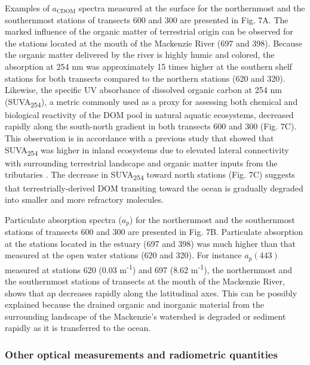 \documentclass[essd, manuscript]{copernicus}
\begin{document}
Examples of $a_\text{CDOM}$ spectra measured at the surface for the northernmost and the southernmost stations of transects 600 and 300 are presented in Fig. 7A. The marked influence of the organic matter of terrestrial origin can be observed for the stations located at the mouth of the Mackenzie River (697 and 398). Because the organic matter delivered by the river is highly humic and colored, the absorption at 254 nm was approximately 15 times higher at the southern shelf stations for both transects compared to the northern stations (620 and 320). Likewise, the specific UV absorbance of dissolved organic carbon at 254 nm (SUVA\textsubscript{254}), a metric commonly used as a proxy for assessing both chemical \citep{weishaar2003, westerhoff2004} and biological reactivity \citep{berggren2009, asmala2013} of the DOM pool in natural aquatic ecosystems, decreased rapidly along the south-north gradient in both transects 600 and 300 (Fig. 7C). This observation is in accordance with a previous study that showed that SUVA\textsubscript{254} was higher in inland ecosystems due to elevated lateral connectivity with surrounding terrestrial landscape and organic matter inputs from the tributaries \citep{Massicotte2017}. The decrease in SUVA\textsubscript{254} toward north stations (Fig. 7C) suggests that terrestrially-derived DOM transiting toward the ocean is gradually degraded into smaller and more refractory molecules.

Particulate absorption spectra ($a_p$) for the northernmost and the southernmost stations of transects 600 and 300 are presented in Fig. 7B. Particulate absorption at the stations located in the estuary (697 and 398) was much higher than that measured at the open water stations (620 and 320). For instance $a_p(443)$ measured at stations 620 (0.03 m\textsuperscript{-1}) and 697 (8.62 m\textsuperscript{-1}), the northernmost and the southernmost stations of transects at the mouth of the Mackenzie River, shows that ap decreases rapidly along the latitudinal axes. This can be possibly explained because the drained organic and inorganic material from the surrounding landscape of the Mackenzie's watershed is degraded or sediment rapidly as it is transferred to the ocean.

\subsubsection{Other optical measurements and radiometric quantities}
\end{document}
